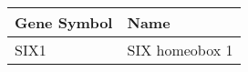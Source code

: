 \begin{tabular}{ll}
\toprule
Gene Symbol &           Name \\
\midrule
       SIX1 & SIX homeobox 1 \\
\bottomrule
\end{tabular}
